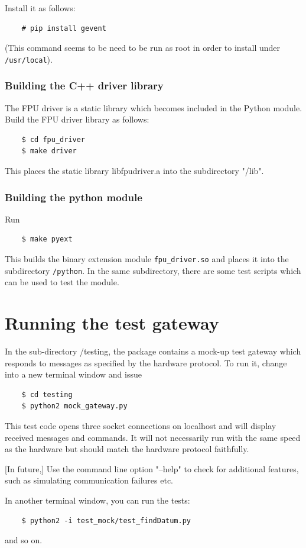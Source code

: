 \documentclass{scrartcl}[12pt,a4paper]
\begin{document}
Install it as follows:

  \begin{verbatim}
    # pip install gevent
  \end{verbatim}    

(This command seems to be need to be run as root in order to install
  under \texttt{/usr/local}).



\subsubsection{Building the C++ driver library}

The FPU driver is a static library which becomes included in the
Python module.  Build the FPU driver library as follows:

  \begin{verbatim}
    $ cd fpu_driver
    $ make driver
  \end{verbatim}    

This places the static library libfpudriver.a into
the subdirectory "/lib".

\subsubsection{Building the python module}

Run

  \begin{verbatim}
    $ make pyext
  \end{verbatim}    

This builds the binary extension module \verb+fpu_driver.so+
and places it into the subdirectory \verb+/python+.
In the same subdirectory, there are some test
scripts which can be used to test the module.


\section{Running the test gateway} 

In the sub-directory /testing, the package contains a mock-up test
gateway which responds to messages as specified by the hardware
protocol. To run it, change into a new terminal window and
issue

  \begin{verbatim}
    $ cd testing
    $ python2 mock_gateway.py
  \end{verbatim}    


This test code opens three socket connections on localhost and will
display received messages and commands. It will not necessarily
run with the same speed as the hardware but should match the
hardware protocol faithfully.

[In future,] Use the command line option "--help" to check for additional features,
such as simulating communication failures etc.

In another terminal window, you can run the tests:
  \begin{verbatim}
    $ python2 -i test_mock/test_findDatum.py
  \end{verbatim}    
and so on.
\end{document}
